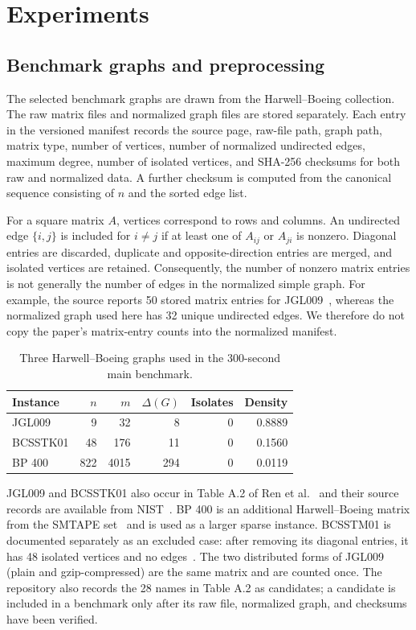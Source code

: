\section{Experiments}
\label{sec:experiments}

\subsection{Benchmark graphs and preprocessing}
The selected benchmark graphs are drawn from the Harwell--Boeing collection.
The raw matrix files and normalized graph files are stored separately. Each
entry in the versioned manifest records the source page, raw-file path, graph
path, matrix type, number of vertices, number of normalized undirected edges,
maximum degree, number of isolated vertices, and SHA-256 checksums for both
raw and normalized data. A further checksum is computed from the canonical
sequence consisting of $n$ and the sorted edge list.

For a square matrix $A$, vertices correspond to rows and columns. An undirected
edge $\{i,j\}$ is included for $i\ne j$ if at least one of $A_{ij}$ or
$A_{ji}$ is nonzero. Diagonal entries are discarded, duplicate and
opposite-direction entries are merged, and isolated vertices are retained.
Consequently, the number of nonzero matrix entries is not generally the number
of edges in the normalized simple graph. For example, the source reports 50
stored matrix entries for JGL009~\cite{NISTJGL009}, whereas the normalized graph used here has 32 unique
undirected edges. We therefore do not copy the paper's matrix-entry counts into
the normalized manifest.

\begin{table}[t]
\centering
\caption{Three Harwell--Boeing graphs used in the 300-second main benchmark.}
\label{tab:dataset}
\begin{tabular}{lrrrrr}
\hline
Instance & $n$ & $m$ & $\Delta(G)$ & Isolates & Density \\
\hline
JGL009 & 9 & 32 & 8 & 0 & 0.8889 \\
BCSSTK01 & 48 & 176 & 11 & 0 & 0.1560 \\
BP 400 & 822 & 4015 & 294 & 0 & 0.0119 \\
\hline
\end{tabular}
\end{table}

JGL009 and BCSSTK01 also occur in Table A.2 of Ren et al.~\cite{Ren2020CBMP}
and their source records are available from NIST~\cite{NISTJGL009,NISTBCSSTK01}.
BP 400 is an additional Harwell--Boeing matrix from the SMTAPE set~\cite{NISTBP400}
and is used as a larger sparse instance. BCSSTM01 is documented separately as
an excluded case: after removing its diagonal entries, it has 48 isolated
vertices and no edges~\cite{NISTBCSSTM01}. The two distributed forms of JGL009
(plain and gzip-compressed) are the same matrix and are counted once. The
repository also records the 28 names in
Table A.2 as candidates; a candidate is included in a benchmark only
after its raw file, normalized graph, and checksums have been verified.

